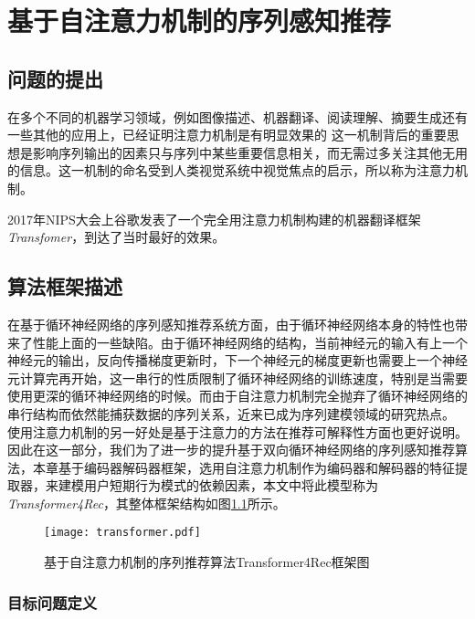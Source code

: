 ﻿%
\chapter{基于自注意力机制的序列感知推荐}

\section{问题的提出}
在多个不同的机器学习领域，例如图像描述、机器翻译、阅读理解、摘要生成还有一些其他的应用上，已经证明注意力机制是有明显效果的%
这一机制背后的重要思想是影响序列输出的因素只与序列中某些重要信息相关，而无需过多关注其他无用的信息。这一机制的命名受到人类视觉系统中视觉焦点的启示，所以称为注意力机制。

2017年NIPS大会上谷歌发表了一个完全用注意力机制构建的机器翻译框架\textit{Transfomer}，到达了当时最好的效果。
\section{算法框架描述}

在基于循环神经网络的序列感知推荐系统方面，由于循环神经网络本身的特性也带来了性能上面的一些缺陷。由于循环神经网络的结构，当前神经元的输入有上一个神经元的输出，反向传播梯度更新时，下一个神经元的梯度更新也需要上一个神经元计算完再开始，这一串行的性质限制了循环神经网络的训练速度，特别是当需要使用更深的循环神经网络的时候。而由于自注意力机制完全抛弃了循环神经网络的串行结构而依然能捕获数据的序列关系，近来已成为序列建模领域的研究热点。
使用注意力机制的另一好处是基于注意力的方法在推荐可解释性方面也更好说明。%
因此在这一部分，我们为了进一步的提升基于双向循环神经网络的序列感知推荐算法，本章基于编码器解码器框架，选用自注意力机制作为编码器和解码器的特征提取器，来建模用户短期行为模式的依赖因素，本文中将此模型称为\textit{Transformer4Rec}，其整体框架结构如图\ref{fig:transformer}所示。

\begin{figure}[htb]
  \centering
  \texttt{[image: transformer.pdf]}\\
  \caption{基于自注意力机制的序列推荐算法Transformer4Rec框架图}
  \label{fig:transformer}
\end{figure}

\subsection{目标问题定义}

